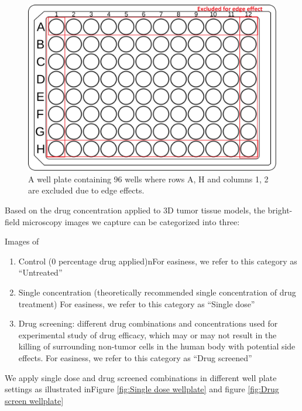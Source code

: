 \begin{figure}[H]
  \centering
  \includegraphics[width=0.9\linewidth]{figures/WellPlate.png} %
  \caption{A well plate containing 96 wells where rows A, H and columns 1, 2 are excluded due to edge effects.}
  \label{fig:Wellplate}
\end{figure}





Based on the drug concentration applied to 3D tumor tissue models, the bright-field microscopy images we capture can be categorized into three:

Images of

\begin{enumerate}
  \item Control (0 percentage drug applied)nFor easiness, we refer to this category as ``Untreated''
    
  \item Single concentration (theoretically recommended single concentration of drug treatment) For easiness, we refer to this category as ``Single dose''
        
  \item Drug screening: different drug combinations and concentrations used for experimental study of drug efficacy, which may or may not result in the killing 
  of surrounding non-tumor cells in the human body with potential side effects. For easiness, we refer to this category as ``Drug screened''
        
\end{enumerate}

We apply single dose and drug screened combinations in different well plate settings as illustrated inFigure \ref{fig:Single dose wellplate} and figure 
\ref{fig:Drug screen wellplate}  

